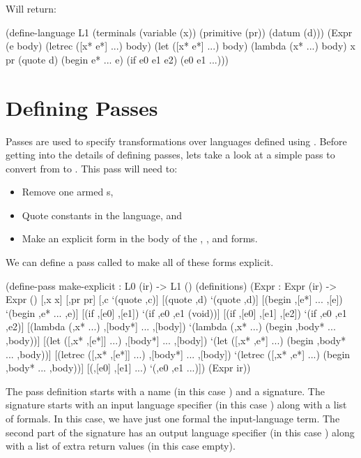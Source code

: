 \documentclass[letterpaper,10pt]{article}
\begin{document}
Will return: 

\begin{schemedisplay}
(define-language L1
  (terminals
    (variable (x))
    (primitive (pr))
    (datum (d)))
  (Expr (e body)
    (letrec ([x* e*] ...) body)
    (let ([x* e*] ...) body)
    (lambda (x* ...) body)
    x
    pr
    (quote d)
    (begin e* ... e)
    (if e0 e1 e2)
    (e0 e1 ...)))
\end{schemedisplay}

\section{Defining Passes}

Passes are used to specify transformations over languages defined using
.
Before getting into the details of defining passes, lets take a look at a
simple pass to convert from  to .
This pass will need to:
\begin{itemize}
\item Remove one armed s,
\item Quote constants in the language, and
\item Make  an explicit form in the body of the ,
, and  forms.
\end{itemize}

We can define a pass called  to make all of these forms
explicit.

\begin{schemedisplay}
(define-pass make-explicit : L0 (ir) -> L1 ()
  (definitions)
  (Expr : Expr (ir) -> Expr ()
    [,x x]
    [,pr pr]
    [,c `(quote ,c)]
    [(quote ,d) `(quote ,d)]
    [(begin ,[e*] ... ,[e]) `(begin ,e* ... ,e)]
    [(if ,[e0] ,[e1]) `(if ,e0 ,e1 (void))]
    [(if ,[e0] ,[e1] ,[e2]) `(if ,e0 ,e1 ,e2)]
    [(lambda (,x* ...) ,[body*] ... ,[body])
     `(lambda (,x* ...) (begin ,body* ... ,body))]
    [(let ([,x* ,[e*]] ...) ,[body*] ... ,[body])
     `(let ([,x* ,e*] ...) (begin ,body* ... ,body))]
    [(letrec ([,x* ,[e*]] ...) ,[body*] ... ,[body])
     `(letrec ([,x* ,e*] ...) (begin ,body* ... ,body))]
    [(,[e0] ,[e1] ...) `(,e0 ,e1 ...)])
  (Expr ir))
\end{schemedisplay}

The pass definition starts with a name (in this case )
and a signature.
The signature starts with an input language specifier (in this case
) along with a list of formals.
In this case, we have just one formal  the input-language term.
The second part of the signature has an output language specifier (in this case
) along with a list of extra return values (in this case empty).
\end{document}
